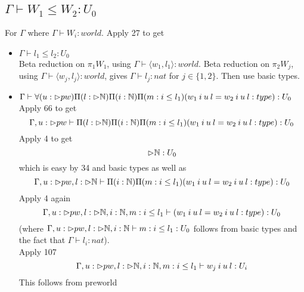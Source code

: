 \message{ !name(paper.tex)}\documentclass{article}
\begin{document}
\subsection*{$\Gamma \vdash W_1 \leq W_2:U_0$}
For $\Gamma$ where $\Gamma \vdash W_i: world$.
Apply 27 to get
\begin{itemize}
    \item $\Gamma \vdash l_1 \leq l_2 : U_0$\\
      Beta reduction on $\pi_1 W_1$, using $\Gamma \vdash \langle w_1, l_1 \rangle : world$.
         Beta reduction on $\pi_2 W_j$, using $\Gamma \vdash \langle w_j, l_j \rangle : world$, gives
    $\Gamma \vdash l_j: nat$ for $j \in \{1, 2\}$. Then use basic types. 
    \item $\Gamma \vdash \forall(u: \rhd pw)\Pi(l: \rhd \mathbb{N})\Pi(i: \mathbb{N})\Pi(m : i \leq l_1)(w_1 \: i \: u \: l = w_2 \: i \: u \: l : type): U_0$\\
    Apply 66 to get 
    \[\Gamma, u: \rhd pw \vdash \Pi(l: \rhd \mathbb{N})\Pi(i: \mathbb{N})\Pi(m : i \leq l_1)(w_1 \: i \: u \: l = w_2 \: i \: u \: l : type): U_0\]
    Apply 4 to get 
    \[\rhd \mathbb{N}: U_0\] which is easy by 34 and basic types
    as well as
    \[\Gamma, u: \rhd pw , l : \rhd \mathbb{N} \vdash \Pi(i: \mathbb{N})\Pi(m : i \leq l_1)(w_1 \: i \: u \: l = w_2 \: i \: u \: l : type): U_0\]
Apply 4 again 
    \[\Gamma, u: \rhd pw , l : \rhd \mathbb{N}, i: \mathbb{N}, m: i \leq l_1 \vdash (w_1 \: i \: u \: l = w_2 \: i \: u \: l : type): U_0\]
    (where $\Gamma, u: \rhd pw , l : \rhd \mathbb{N}, i: \mathbb{N} \vdash m: i \leq l_1 : U_0$ follows from basic types and the fact that $\Gamma \vdash l_i: nat$).\\
    Apply 107 
    \[\Gamma, u: \rhd pw , l : \rhd \mathbb{N}, i: \mathbb{N}, m: i \leq l_1 \vdash w_j \: i \: u \: l : U_i\]
    This follows from preworld

\end{itemize}
\end{document}
